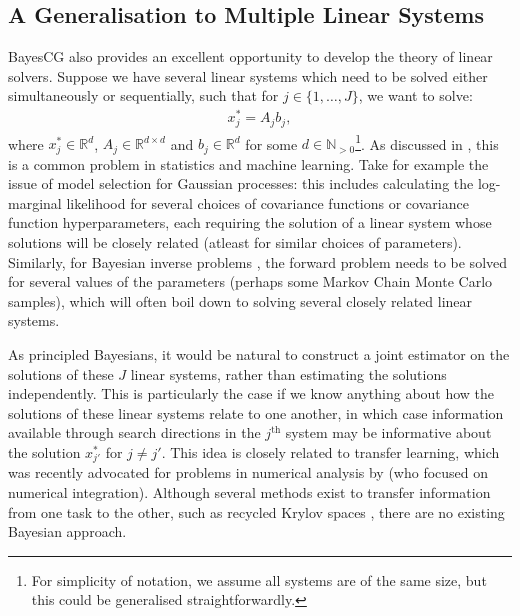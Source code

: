 \documentclass[twoside]{article}
\begin{document}






\subsection*{A Generalisation to Multiple Linear Systems}

BayesCG also provides an excellent opportunity to develop the theory of linear solvers. Suppose we have several linear systems which need to be solved either simultaneously or sequentially, such that for $j \in \{1,\ldots,J\}$, we want to solve:
\begin{align*}
x_j^* = A_j b_j,  
\end{align*}
where $x_j^* \in \mathbb{R}^d$, $A_j \in \mathbb{R}^{d \times d}$ and $b_j \in \mathbb{R}^d$ for some $d \in \mathbb{N}_{> 0}$\footnote{For simplicity of notation, we assume all systems are of the same size, but this could be generalised straightforwardly.}. As discussed in 
\cite{DeRoos2017}, this is a common problem in statistics and machine learning. Take for example the issue of model selection for Gaussian processes: this includes calculating the log-marginal likelihood for several choices of covariance functions or covariance function hyperparameters, each requiring the solution of a linear system whose solutions will be closely related (atleast for similar choices of parameters). Similarly, for Bayesian inverse problems \citep{Dashti2017}, the forward problem needs to be solved for several values of the parameters (perhaps some Markov Chain Monte Carlo samples), which will often boil down to solving several closely related linear systems.

As principled Bayesians, it would be natural to construct a joint estimator on the solutions of these $J$ linear systems, rather than estimating the solutions independently. This is particularly the case if we know anything about how the solutions of these linear systems relate to one another, in which case information available through search directions in the $j^{\text{th}}$ system may be informative about the solution $x^*_{j'}$ for $j \neq j'$. This idea is closely related to transfer learning, which was recently advocated for problems in numerical analysis by \cite{Xi2018MultiOutput} (who focused on numerical integration). Although several methods exist to transfer information from one task to the other, such as recycled Krylov spaces \citep{DeRoos2017}, there are no existing Bayesian approach. 
\end{document}
